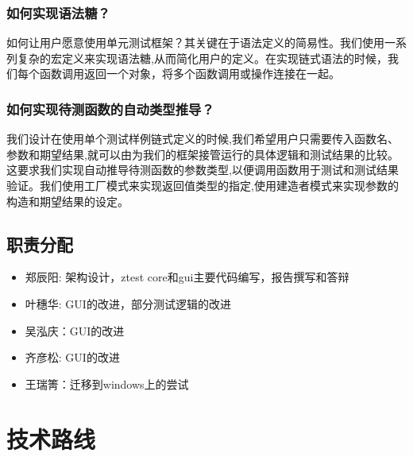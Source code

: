 \documentclass{article}
\begin{document}
\subsubsection{如何实现语法糖？}
如何让用户愿意使用单元测试框架？其关键在于语法定义的简易性。我们使用一系列复杂的宏定义来实现语法糖,从而简化用户的定义。在实现链式语法的时候，我们每个函数调用返回一个对象，将多个函数调用或操作连接在一起。
\subsubsection{如何实现待测函数的自动类型推导？}
我们设计在使用单个测试样例链式定义的时候,我们希望用户只需要传入函数名、参数和期望结果,就可以由为我们的框架接管运行的具体逻辑和测试结果的比较。
这要求我们实现自动推导待测函数的参数类型,以便调用函数用于测试和测试结果验证。我们使用工厂模式来实现返回值类型的指定,使用建造者模式来实现参数的构造和期望结果的设定。
\subsection{ 职责分配}
\begin{itemize}[leftmargin=*]
    \item 郑辰阳: 架构设计，ztest core和gui主要代码编写，报告撰写和答辩
    \item 叶穗华: GUI的改进，部分测试逻辑的改进
    \item 吴泓庆：GUI的改进
    \item 齐彦松: GUI的改进
    \item 王瑞箐：迁移到windows上的尝试
\end{itemize}

\section{技术路线}
\end{document}
